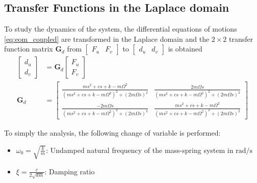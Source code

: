 \documentclass{ISMA_USD2020}
\begin{document}
\subsection{Transfer Functions in the Laplace domain}
\label{sec:org2ee1be9}
To study the dynamics of the system, the differential equations of motions \eqref{eq:eom_coupled} are transformed in the Laplace domain and the \(2 \times 2\) transfer function matrix \(\bm{G}_d\) from \(\begin{bmatrix}F_u & F_v\end{bmatrix}\) to \(\begin{bmatrix}d_u & d_v\end{bmatrix}\) is obtained
\begin{align}
  \begin{bmatrix} d_u \\ d_v \end{bmatrix} &= \bm{G}_d \begin{bmatrix} F_u \\ F_v \end{bmatrix} \label{eq:Gd_mimo_tf} \\
  \bm{G}_{d} &=
  \begin{bmatrix}
    \frac{ms^2 + cs + k - m \Omega^2}{\left( m s^2 + cs + k - m \Omega^2 \right)^2 + \left( 2 m \Omega s \right)^2} & \frac{2 m \Omega s}{\left( m s^2 + cs + k - m \Omega^2 \right)^2 + \left( 2 m \Omega s \right)^2} \\
    \frac{-2 m \Omega s}{\left( m s^2 + cs + k - m \Omega^2 \right)^2 + \left( 2 m \Omega s \right)^2} & \frac{ms^2 + cs + k - m \Omega^2}{\left( m s^2 + cs + k - m \Omega^2 \right)^2 + \left( 2 m \Omega s \right)^2}
  \end{bmatrix} \label{eq:Gd_m_k_c}
\end{align}

To simply the analysis, the following change of variable is performed:
\begin{itemize}
\item \(\omega_0 = \sqrt{\frac{k}{m}}\): Undamped natural frequency of the mass-spring system in \(\si{\radian/\s}\)
\item \(\xi = \frac{c}{2 \sqrt{k m}}\): Damping ratio
\end{itemize}
\end{document}
